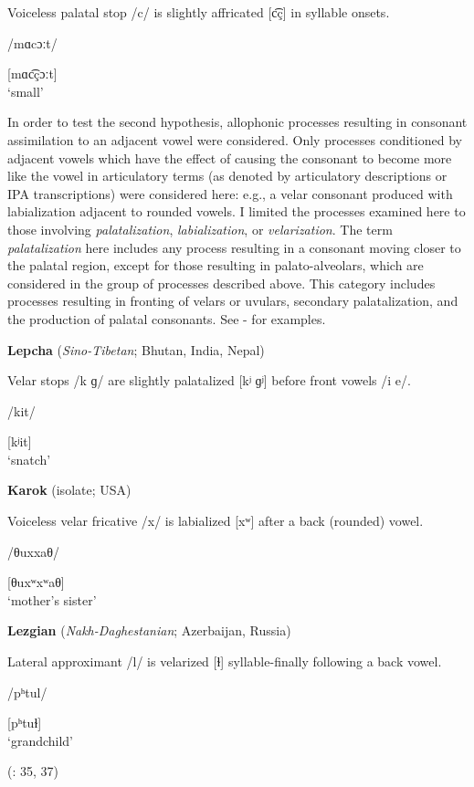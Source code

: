 Voiceless palatal stop /c/ is slightly affricated [c͡ç] in syllable onsets.

/mɑcɔːt/

[mɑc͡çɔːt]\\
\glt ‘small’
\citep[5]{Philips2007}
\z

  In order to test the second hypothesis, allophonic processes resulting in consonant assimilation to an adjacent vowel were considered. Only processes conditioned by adjacent vowels which have the effect of causing the consonant to become more like the vowel in articulatory terms (as denoted by articulatory descriptions or IPA transcriptions) were considered here: e.g., a velar consonant produced with labialization adjacent to rounded vowels. I limited the processes examined here to those involving \textit{palatalization}, \textit{labialization}, or \textit{velarization}. The term \textit{palatalization} here includes any process resulting in a consonant moving closer to the palatal region, except for those resulting in palato-alveolars, which are considered in the group of processes described above. This category includes processes resulting in fronting of velars or uvulars, secondary palatalization, and the production of palatal consonants. See - for examples.

\ea\label{ex:7.6}
  \textbf{Lepcha} (\textit{Sino-Tibetan}; Bhutan, India, Nepal)

Velar stops /k ɡ/ are slightly palatalized [kʲ ɡʲ] before front vowels /i e/.

/kit/

[kʲit]\\
\glt ‘snatch’
\citep[21]{Plaisier2007}
\z

\ea\label{ex:7.7}
  \textbf{Karok} (isolate; USA)

Voiceless velar fricative /x/ is labialized [xʷ] after a back (rounded) vowel.

/θuxxaθ/

[θuxʷxʷaθ]\\
\glt ‘mother’s sister’
\citep[8]{Bright1957}
\z

\ea\label{ex:7.8}
  \textbf{Lezgian} (\textit{Nakh-Daghestanian}; Azerbaijan, Russia)

Lateral approximant /l/ is velarized [ɫ] syllable-finally following a back vowel.

/pʰtul/

[pʰtuɫ]\\
\glt ‘grandchild’

(\citealt{Haspelmath1993}: 35, 37)
\z

